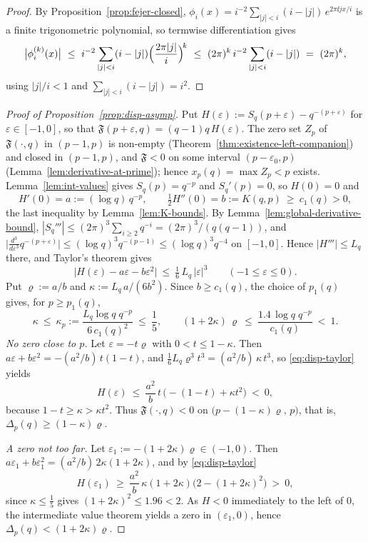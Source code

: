 \begin{proof}
By Proposition~\ref{prop:fejer-closed}, $\phi_i(x)=i^{-2}\sum_{|j|<i}(i-|j|)\,e^{2\pi\ii jx/i}$ is a finite trigonometric polynomial, so termwise differentiation gives
\[
\bigl|\phi_i^{(k)}(x)\bigr|\ \le\ i^{-2}\sum_{|j|<i}(i-|j|)\Bigl(\frac{2\pi|j|}{i}\Bigr)^{\!k}
\ \le\ (2\pi)^k\, i^{-2}\sum_{|j|<i}(i-|j|)\ =\ (2\pi)^k ,
\]
using $|j|/i<1$ and $\sum_{|j|<i}(i-|j|)=i^2$.
\end{proof}


\begin{proof}[Proof of Proposition~\ref{prop:disp-asymp}]
Put $H(\varepsilon):=S_q(p+\varepsilon)-q^{-(p+\varepsilon)}$ for $\varepsilon\in[-1,0]$, so that $\mathfrak F(p+\varepsilon,q)=(q-1)q\,H(\varepsilon)$. The zero set $Z_p$ of $\mathfrak F(\cdot,q)$ in $(p-1,p)$ is non-empty (Theorem~\ref{thm:existence-left-companion}) and closed in $(p-1,p)$, and $\mathfrak F<0$ on some interval $(p-\varepsilon_0,p)$ (Lemma~\ref{lem:derivative-at-prime}); hence $x_p(q)=\max Z_p<p$ exists. Lemma~\ref{lem:int-values} gives $S_q(p)=q^{-p}$ and $S_q'(p)=0$, so $H(0)=0$ and
\[
H'(0)=a:=(\log q)\,q^{-p},\qquad \tfrac12H''(0)=b:=K(q,p)\ \ge\ c_1(q)>0,
\]
the last inequality by Lemma~\ref{lem:K-bounds}. By Lemma~\ref{lem:global-derivative-bound}, $|S_q'''|\le(2\pi)^3\sum_{i\ge2}q^{-i}=(2\pi)^3/(q(q-1))$, and $\bigl|\tfrac{d^3}{d\varepsilon^3}q^{-(p+\varepsilon)}\bigr|\le(\log q)^3q^{-(p-1)}\le(\log q)^3q^{-4}$ on $[-1,0]$. Hence $|H'''|\le L_q$ there, and Taylor's theorem gives
\begin{equation}\tag{$\ast$}\label{eq:disp-taylor}
\bigl|H(\varepsilon)-a\varepsilon-b\varepsilon^2\bigr|\ \le\ \tfrac16\,L_q\,|\varepsilon|^3\qquad(-1\le\varepsilon\le0).
\end{equation}
Put $\varrho:=a/b$ and $\kappa:=L_q\,a/(6b^2)$. Since $b\ge c_1(q)$, the choice of $p_1(q)$ gives, for $p\ge p_1(q)$,
\[
\kappa\ \le\ \kappa_p:=\frac{L_q\log q\;q^{-p}}{6\,c_1(q)^2}\ \le\ \frac15,\qquad (1+2\kappa)\,\varrho\ \le\ \frac{1.4\,\log q\;q^{-p}}{c_1(q)}\ <\ 1 .
\]
\emph{No zero close to $p$.} Let $\varepsilon=-t\varrho$ with $0<t\le1-\kappa$. Then $a\varepsilon+b\varepsilon^2=-(a^2/b)\,t(1-t)$, and $\frac16L_q\varrho^3t^3=(a^2/b)\,\kappa\,t^3$, so \eqref{eq:disp-taylor} yields
\[
H(\varepsilon)\ \le\ \frac{a^2}{b}\,t\,\bigl(-(1-t)+\kappa t^2\bigr)\ <\ 0,
\]
because $1-t\ge\kappa>\kappa t^2$. Thus $\mathfrak F(\cdot,q)<0$ on $\bigl(p-(1-\kappa)\varrho,\,p\bigr)$, that is, $\Delta_p(q)\ge(1-\kappa)\varrho$.

\emph{A zero not too far.} Let $\varepsilon_1:=-(1+2\kappa)\varrho\in(-1,0)$. Then $a\varepsilon_1+b\varepsilon_1^2=(a^2/b)\,2\kappa(1+2\kappa)$, and by \eqref{eq:disp-taylor}
\[
H(\varepsilon_1)\ \ge\ \frac{a^2}{b}\,\kappa(1+2\kappa)\bigl(2-(1+2\kappa)^2\bigr)\ >\ 0,
\]
since $\kappa\le\frac15$ gives $(1+2\kappa)^2\le1.96<2$. As $H<0$ immediately to the left of $0$, the intermediate value theorem yields a zero in $(\varepsilon_1,0)$, hence $\Delta_p(q)<(1+2\kappa)\varrho$.


\end{proof}
